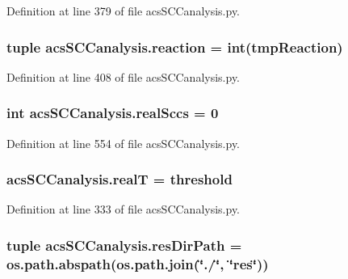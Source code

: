 Definition at line 379 of file acs\-S\-C\-Canalysis.\-py.

\hypertarget{a00096_a58c3618ec28f27dfbf09e0d3aba05bc7}{
\subsubsection[{reaction}]{\setlength{\rightskip}{0pt plus 5cm}tuple acs\-S\-C\-Canalysis.\-reaction = int(tmp\-Reaction)}}\label{a00096_a58c3618ec28f27dfbf09e0d3aba05bc7}


Definition at line 408 of file acs\-S\-C\-Canalysis.\-py.

\hypertarget{a00096_ac6aaa0ac5d13b0736ab3179dc1ed388d}{
\subsubsection[{real\-Sccs}]{\setlength{\rightskip}{0pt plus 5cm}int acs\-S\-C\-Canalysis.\-real\-Sccs = 0}}\label{a00096_ac6aaa0ac5d13b0736ab3179dc1ed388d}


Definition at line 554 of file acs\-S\-C\-Canalysis.\-py.

\hypertarget{a00096_a1c9b45f6074222ace96b7ab38cb8e23b}{
\subsubsection[{real\-T}]{\setlength{\rightskip}{0pt plus 5cm}acs\-S\-C\-Canalysis.\-real\-T = {\bf threshold}}}\label{a00096_a1c9b45f6074222ace96b7ab38cb8e23b}


Definition at line 333 of file acs\-S\-C\-Canalysis.\-py.

\hypertarget{a00096_a9ededb3cd7c63befde39ad68e5f9e006}{
\subsubsection[{res\-Dir\-Path}]{\setlength{\rightskip}{0pt plus 5cm}tuple acs\-S\-C\-Canalysis.\-res\-Dir\-Path = os.\-path.\-abspath(os.\-path.\-join(\char`\"{}./\char`\"{}, \char`\"{}res\char`\"{}))}}\label{a00096_a9ededb3cd7c63befde39ad68e5f9e006}


